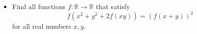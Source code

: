 \documentclass[11pt]{scrartcl}
\begin{document}
\begin{itemize}[label=,itemsep=0.4em,leftmargin=0em]
\begin{comment}
        Considering \( P(0,y) \), we deduce that \( f \) is an even function. Suppose there exist \( a, b > 0 \) such that \( f(a) = 0 \) and \( f(b) = b^2 \).

        \( P(b,-a) \ra f(b^2 - a) = f(b^2 + a) - 4ab^2 \)

        \(P(a,y) \ra f(y) = f(a^2 - y) \ra f(y) = f(a^2 + y), \yr \)

        \( P(b,a^2) \ra f(b^2 + a^2) = f(b^2 - a^2) + 4yb^2 \)

        \( \ra f(a^2 + b^2) = f(a^2 - b^2) + 4a^2b^2 \ra f(b^2) = f(-b^2) + 4a^2b^2 \ra 4a^2b^2 = 0 \)

        This is absurd since \( a, b \neq 0 \). Therefore, the functions that satisfy the conditions are \( \boxed{f(x) = 0 ,\xr} \) and \( \boxed{f(x) = x^2 ,\xr} \).\end{comment}
    

    \item \begin{btvn}
        Find all functions $f: \mathbb{R} \to \mathbb{R}$ that satisfy
        \[
           f(x^2 + y^2 +2f(xy)) = \left(f(x + y)\right)^2
        \]
        for all real numbers $x,y$.
    \end{btvn}
    \begin{comment}
        Let \( P(x,y) \) denote substitution into \( (?) \). Define \( m = x^2 + y^2 \) and \( n = xy \). Then \( m^2 \geq 4n \). Let \( g(x) = 2f(x) - 2x \), rewriting 
\[
    f(m^2 + g(n)) = f(m)^2, \quad m^2 \geq 4n \tag{1}
\]
Let \( c = f(0) = g(0) \). From \( (1) \), substituting \( P(m,0) \) yields \( f(m^2 + c) = f(m)^2, \forall m \in \bb{R}, (2) \).

\textbf{Claim 1:} \( f(x) \geq 0, \forall x \geq c \geq 0 \) \( (3) \).

\begin{pro}
Assume \( c < 0 \).

From \( (2) \), substituting \( m \to \sqrt{-c} \), we get \( f(0) = f(\sqrt{-c})^2 \ra c = f(\sqrt{-c})^2 \geq 0 \), which is absurd.

Thus, \( f(x + c) = f(\sqrt{x})^2 \geq 0, \forall x \geq 0 \).
\end{pro}

\textbf{Claim 2:} \( f \) is constant for \( x > c \).

\begin{pro}
If \( g \) is constant, it's easy to see \( f(x) = x, \xr \) is a solution. Assume \( g \) is non-constant. Choose \( p_1 > p_2 \in \bb{R} \) such that \( g(p_1) \neq g(p_2) \) and \( u > v > \max\{4p_1,4p_2,c\} \) such that \( u^2 - v^2 = g(p_1) - g(p_2) = d \), where \( d \) is constant. Then,


\end{comment}
\end{itemize}
\end{document}
